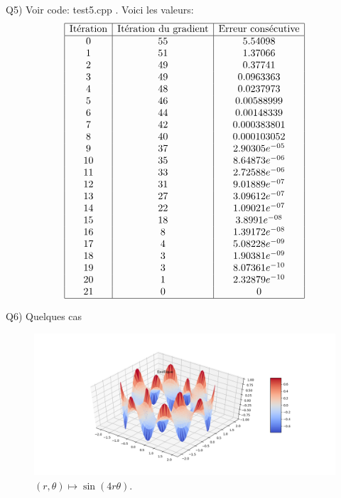 \documentclass[a4paper, 11pt]{article}
\begin{document}
Q5) Voir code: test5.cpp . Voici les valeurs: \\
$$
\begin{array}{|c|c|c|}
\hline
\text{It\'eration} & \text{It\'eration du gradient} & \text{Erreur cons\'ecutive}
 \\
\hline
0 & 55 & 5.54098 \\
1 & 51 & 1.37066 \\
2 & 49 & 0.37741 \\
3 & 49 & 0.0963363 \\
4 & 48 & 0.0237973 \\
5 & 46 & 0.00588999 \\
6 & 44 & 0.00148339 \\
7 & 42 & 0.000383801 \\
8 & 40 & 0.000103052 \\
9 & 37 & 2.90305e^{-05} \\
10 & 35 & 8.64873e^{-06} \\
11 & 33 & 2.72588e^{-06} \\
12 & 31 & 9.01889e^{-07} \\
13 & 27 & 3.09612e^{-07} \\
14 & 22 & 1.09021e^{-07} \\
15 & 18 & 3.8991e^{-08} \\
16 & 8 & 1.39172e^{-08} \\
17 & 4 & 5.08228e^{-09} \\
18 & 3 & 1.90381e^{-09} \\
19 & 3 & 8.07361e^{-10} \\
20 & 1 & 2.32879e^{-10} \\
21 & 0 & 0 \\
\hline
\end{array}
$$


Q6) Quelques cas \\

\begin{figure}[h!]
  \centering
  \includegraphics[width=\linewidth]{exotique.png}
  \caption{$(r, \theta)\mapsto\sin(4r\theta)$.}
  \label{fig:exotique}
\end{figure}
\clearpage
\end{document}
